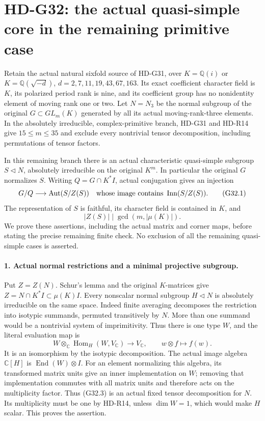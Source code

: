 \section{HD-G32: the actual quasi-simple core in the remaining primitive case}
\label{sec:primitive-quasisimple-core}

Retain the actual natural sixfold source of HD-G31, over
\(K=\mathbb Q(i)\) or
\(K=\mathbb Q(\sqrt{-d})\), \(d=2,7,11,19,43,67,163\).
Its exact coefficient character field is \(K\), its polarized
period rank is nine, and its coefficient group has no nonidentity
element of moving rank one or two. Let \(N=N_3\) be the normal
subgroup of the original \(G\subset GL_m(K)\) generated by all
its actual moving-rank-three elements. In the absolutely irreducible,
complex-primitive branch, HD-G31 and HD-R14 give
\(15\le m\le35\) and exclude every nontrivial tensor decomposition,
including permutations of tensor factors.

In this remaining branch there is an actual characteristic
quasi-simple subgroup \(S\triangleleft N\), absolutely irreducible
on the original \(K^m\). In particular the original \(G\) normalizes
\(S\). Writing \(Q=G\cap K^*I\), actual conjugation gives an injection
\[
      G/Q\longrightarrow\operatorname{Aut}(S/Z(S))
      \quad\hbox{whose image contains }\operatorname{Inn}(S/Z(S)).
 \tag{G32.1}
\]
The representation of \(S\) is faithful, its character field is
contained in \(K\), and
\[
                  |Z(S)|\mid\gcd(m,|\mu(K)|).
 \tag{G32.2}
\]
We prove these assertions, including the actual matrix and corner
maps, before stating the precise remaining finite check. No
exclusion of all the remaining quasi-simple cases is asserted.

\paragraph{1. Actual normal restrictions and a minimal projective subgroup.}
Put \(Z=Z(N)\). Schur's lemma and the original \(K\)-matrices give
\(Z=N\cap K^*I\subset\mu(K)I\). Every nonscalar normal subgroup
\(H\triangleleft N\) is absolutely irreducible on the same space.
Indeed finite averaging decomposes the restriction into isotypic
summands, permuted transitively by \(N\). More than one summand
would be a nontrivial system of imprimitivity. Thus there is one
type \(W\), and the literal evaluation map is
\[
 W\otimes_{\mathbb C}\operatorname{Hom}_H(W,V_{\mathbb C})
       \longrightarrow V_{\mathbb C},\qquad w\otimes f\longmapsto f(w).
 \tag{G32.3}
\]
It is an isomorphism by the isotypic decomposition. The actual
image algebra \(\mathbb C[H]\) is
\(\operatorname{End}(W)\otimes I\). For an element normalizing
this algebra, its transformed matrix units give an inner
implementation on \(W\); removing that implementation commutes
with all matrix units and therefore acts on the multiplicity
factor. Thus (G32.3) is an actual fixed tensor decomposition for
\(N\). Its multiplicity must be one by HD-R14, unless \(\dim W=1\),
which would make \(H\) scalar. This proves the assertion.

